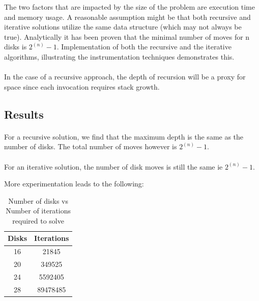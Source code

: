 \documentclass[a4paper,11pt]{article}
\theoremstyle{mytheor}
\begin{document}
The two factors that are impacted by the size of the problem are execution time and memory usage. A reasonable assumption might be that both recursive and iterative solutions utilize the same data structure (which may not always be true). Analytically it has been proven that the minimal number of moves for n disks is $2^{(n)} - 1$. Implementation of both the recursive and the iterative algorithms, illustrating the instrumentation techniques demonstrates this.

\paragraph{}
 In the case of a recursive approach, the depth of recursion will be a proxy for space since each invocation requires stack growth.
 
\subsection*{Results}

\paragraph{}
For a recursive solution, we find that the maximum depth is the same as the number of disks. The total number of moves however is $2^{(n)} - 1$.


\paragraph{}
For an iterative solution, the number of disk moves is still the same ie $2^{(n)} - 1$.

More experimentation leads to the following:
\begin{table}[h!]
\begin{center}
\begin{tabular}{ | c | c | }
\hline
 Disks & Iterations \\
 \hline
 16 & 21845 \\ 
 20 & 349525 \\  
 24 & 5592405 \\
 28 & 89478485 \\
 \hline
\end{tabular}
\caption{Number of disks vs Number of iterations required to solve}
\label{table:1}
\end{center}

\end{table}
\end{document}
